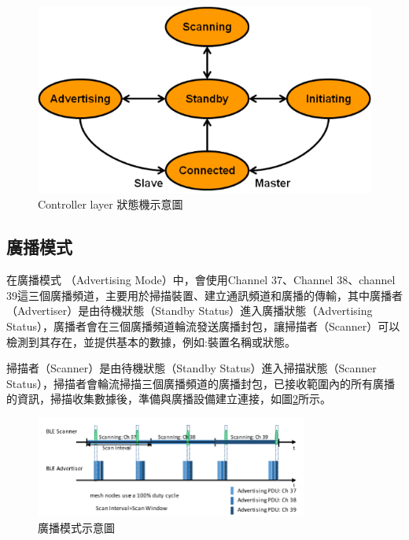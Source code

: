 \begin{ZhChapter}
\begin{figure}[htbp]
    \centering
    \includegraphics[width = 1\textwidth]{image/ble-link-layer-sm.png}
    \caption{Controller layer 狀態機示意圖\cite{microchip2023}}
    \label{fig: Controller layer 狀態機示意圖}
\end{figure}

\subsection{廣播模式}

在廣播模式 （Advertising Mode）中，會使用Channel 37、Channel 38、channel 39這三個廣播頻道，主要用於掃描裝置、建立通訊頻道和廣播的傳輸，其中廣播者（Advertiser）是由待機狀態（Standby Status）進入廣播狀態（Advertising Status），廣播者會在三個廣播頻道輪流發送廣播封包，讓掃描者（Scanner）可以檢測到其存在，並提供基本的數據，例如:裝置名稱或狀態。

掃描者（Scanner）是由待機狀態（Standby Status）進入掃描狀態（Scanner Status），掃描者會輪流掃描三個廣播頻道的廣播封包，已接收範圍內的所有廣播的資訊，掃描收集數據後，準備與廣播設備建立連接，如圖\ref{fig: 廣播模式示意圖}所示。
\begin{figure}[htbp]
    \centering
    \includegraphics[width = 0.8\textwidth]{image/廣播模式示意圖.png}
    \caption{廣播模式示意圖\cite{9035389}}
    \label{fig: 廣播模式示意圖}
\end{figure}


\end{ZhChapter}
